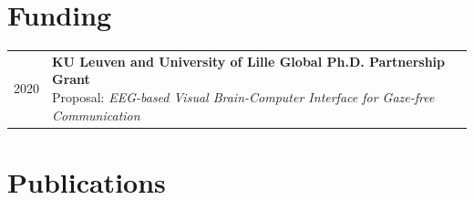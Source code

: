 \documentclass[10pt,a4paper]{article}
\begin{document}
    \section*{Funding}

    \begin{tabularx}{\linewidth}{@{}p{1.2in} X@{}}
        2020 & \makecell[{{X}}t]{\textbf{KU Leuven and University of Lille Global Ph.D. Partnership Grant} \\
        Proposal: \textit{EEG-based Visual Brain-Computer Interface for Gaze-free Communication}} \\

    \end{tabularx}

    \section*{Publications}


    \nocite{*}

    \printbibliography[heading=none]
\end{document}
